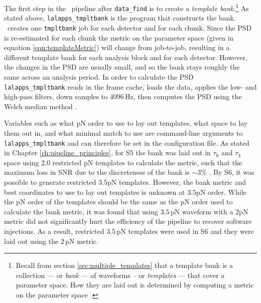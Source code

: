 The first step in the \hipe~pipeline after \verb|data_find| is to create a
\emph{template bank}.\footnote{Recall from section \ref{sec:multiple_templates}
that a template bank is a collection --- or \emph{bank} --- of waveforms -- or
\emph{templates} --- that cover a parameter space. How they are laid out is
determined by computing a metric on the parameter space \cite{Owen:1995tm,
Owen:1998dk, Tanaka:2000, BBCCS:2006, hexabank}.} As stated above,
\texttt{lalapps\_tmpltbank} is the program that constructs the bank.
\hipe~creates one \texttt{tmpltbank} job for each detector and for each chunk.
Since the \ac{PSD} is re-estimated for each chunk the metric on the parameter
space (given in equation \ref{eqn:templateMetric}) will change from job-to-job,
resulting in a different template bank for each analysis block and for each
detector. However, the changes in the \ac{PSD} are usually small, and so the
bank stays roughly the same across an analysis period. In order to calculate
the \ac{PSD} \texttt{lalapps\_tmpltbank} reads in the frame cache, loads the
data, applies the low- and high-pass filters, down samples to $4096\,$Hz, then
computes the \ac{PSD} using the Welch median method \cite{Allen:2005fk}.

Variables such as what \ac{pN} order to use to lay out templates, what space to
lay them out in, and what minimal match to use are command-line arguments to
\texttt{lalapps\_tmpltbank} and can therefore be set in the configuration file.
As stated in Chapter \ref{ch:pipeline_principles}, for \ac{S5} the bank was
laid out in $\tau_0$ and $\tau_3$ space using $2.0$ restricted \ac{pN}
templates to calculate the metric, such that the maximum loss in \ac{SNR} due
to the discreteness of the bank is $\sim3\%$ \cite{Collaboration:2009tt,
Abbott:2009qj, Collaboration:S6CBClowmass}. By \ac{S6}, it was possible to
generate restricted $3.5$\ac{pN} templates. However, the bank metric and best
coordinates to use to lay out templates is unknown at $3.5$\ac{pN} order. While
the \ac{pN} order of the templates should be the same as the \ac{pN} order used
to calculate the bank metric, it was found that using $3.5\,$\ac{pN} waveform
with a 2\ac{pN} metric did not significantly hurt the efficiency of the
pipeline to recover software injections. As a result, restricted $3.5\,$\ac{pN}
templates were used in \ac{S6} and they were laid out using the $2\,$\ac{pN}
metric.

